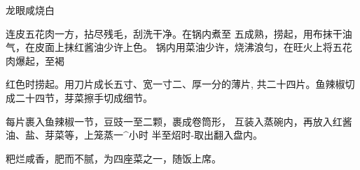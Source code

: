 \begin{recipe}{龙眼咸烧白}

\ingredients


\cooking

\step 连皮五花肉一方，拈尽残毛，刮洗干净。在锅内煮至 五成熟，捞起，用布抹干油气，在皮面上抹红酱油少许上色。 锅内用菜油少许，烧沸浪匀，在旺火上将五花肉爆起，至褐

红色时捞起。用刀片成长五寸、宽一寸二、厚一分的薄片, 共二十四片。鱼辣椒切成二十四节，芽菜擦手切成细节。

\step 每片裹入鱼辣椒一节，豆豉一至二颗，裹成卷筒形， 互装入蒸碗内，再放入红酱油、盐、芽菜等，上笼蒸一^小时 半至炤时-取出翻入盘内。

\notes

粑烂咸香，肥而不腻，为四座菜之一，随饭上席。

\end{recipe}

